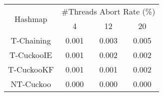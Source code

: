 \begin{tabular}{|c|c|c|c|}
\hline
\multirow{2}{*}{Hashmap} & \multicolumn{3}{c|}{\#Threads Abort Rate (\%)}\\\cline{2-4}& 4 & 12 & 20\\
\hline
\hline
T-Chaining & 0.001 & 0.003 & 0.005\\
T-CuckooIE & 0.001 & 0.002 & 0.002\\
T-CuckooKF & 0.001 & 0.001 & 0.002\\
NT-Cuckoo & 0.000 & 0.000 & 0.000\\
\hline
\end{tabular}
